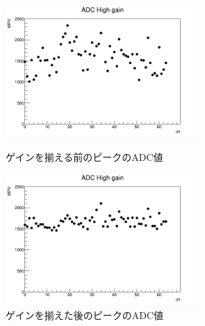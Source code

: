 \begin{figure}[H]
    \begin{minipage}[b]{0.47\linewidth}
        \centering
        \includegraphics[height=5cm]{img/gain_before.jpg}
        \caption{ゲインを揃える前のピークのADC値}
        \label{fig:gain_before}
    \end{minipage}
    \begin{minipage}[b]{0.47\linewidth}
        \centering
        \includegraphics[height=5cm]{img/gain_after.jpg}
        \caption{ゲインを揃えた後のピークのADC値}
        \label{fig:gain_after}
    \end{minipage}
\end{figure}